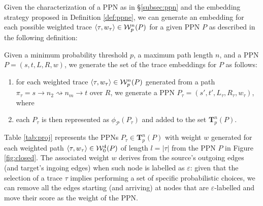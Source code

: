 Given the characterization of a PPN as in \S\ref{subsec:ppn} and the embedding strategy proposed in Definition \ref{def:ppne}, we can generate an embedding for each possible weighted trace $\braket{\tau,w_\tau}\in\mathcal{W}_p^n(P)$ for a given PPN $P$ as described in the following definition:
\begin{definition}
Given a minimum probability threshold $p$, a maximum path length $n$, and a PPN $P=(s,t,L,R,w)$, we generate the set of the trace embeddings for $P$ as follows:
\begin{enumerate}
	\item for each weighted trace $\braket{\tau,w_\tau}\in\mathcal{W}_p^n(P)$ generated from a path $\pi_\tau=s\to n_2\rightsquigarrow n_m\to t$ over $R$, we generate a PPN $P_\tau=(s',t',L_\tau,R_\tau,w_\tau)$, where 
	\item each $P_\tau$ is then represented as $\phi_{\mathcal{P}}(P_\tau)$ and added to the set $\mathbf{T}_p^n(P)$.
\end{enumerate}
\end{definition}

\begin{example}
	Table \ref{tab:proj} represents the PPNs $P_\tau\in\mathbf{T}_p^n(P)$ with weight $w$ generated for each weighted path $\braket{\tau,w_\tau}\in \mathcal{W}_0^4(P)$ of length $l=|\tau|$ from the PPN $P$ in Figure \ref{fig:closed}. The associated weight $w$ derives from the source's outgoing edges (and target's ingoing edges) when such node is  labelled as $\varepsilon$: given that the selection of a trace $\tau$ implies performing a set of specific probabilistic choices, we can remove all the edges starting (and arriving) at nodes that are $\varepsilon$-labelled and move their score as the weight of the PPN. 
\end{example}

